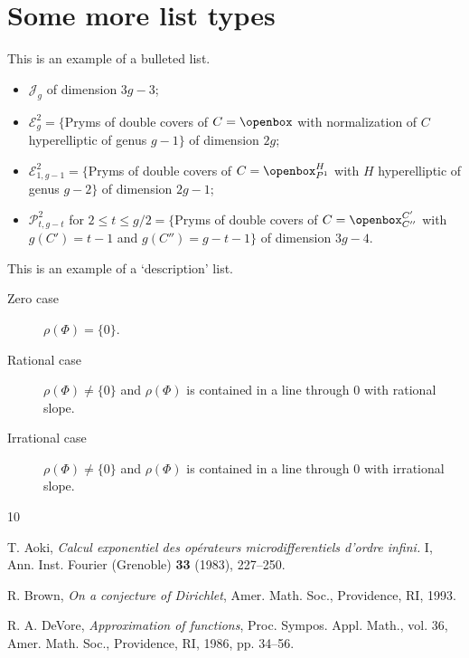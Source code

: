 \documentclass{mcom-l}
\theoremstyle{definition}
\theoremstyle{remark}
\numberwithin{equation}{section}
\newcommand{\blankbox}[2]{%
  \parbox{\columnwidth}{\centering
    \setlength{\fboxsep}{0pt}%
    \fbox{\raisebox{0pt}[#2]{\hspace{#1}}}%
  }%
}
\begin{document}
\begin{figure}[tb]
\blankbox{.75\columnwidth}{3pc}
\caption{}\label{otherfig}
\end{figure}

\section{Some more list types}
This is an example of a bulleted list.

\begin{itemize}
\item $\mathcal{J}_g$ of dimension $3g-3$;
\item $\mathcal{E}^2_g=\{$Pryms of double covers of $C=\openbox$ with
normalization of $C$ hyperelliptic of genus $g-1\}$ of dimension $2g$;
\item $\mathcal{E}^2_{1,g-1}=\{$Pryms of double covers of
$C=\openbox^H_{P^1}$ with $H$ hyperelliptic of genus $g-2\}$ of
dimension $2g-1$;
\item $\mathcal{P}^2_{t,g-t}$ for $2\le t\le g/2=\{$Pryms of double
covers of $C=\openbox^{C'}_{C''}$ with $g(C')=t-1$ and $g(C'')=g-t-1\}$
of dimension $3g-4$.
\end{itemize}

This is an example of a `description' list.

\begin{description}
\item[Zero case] $\rho(\Phi) = \{0\}$.

\item[Rational case] $\rho(\Phi) \ne \{0\}$ and $\rho(\Phi)$ is
contained in a line through $0$ with rational slope.

\item[Irrational case] $\rho(\Phi) \ne \{0\}$ and $\rho(\Phi)$ is
contained in a line through $0$ with irrational slope.
\end{description}


\begin{thebibliography}{10}

 T. Aoki, \textit{Calcul exponentiel des op\'erateurs
microdifferentiels d'ordre infini.} I, Ann. Inst. Fourier (Grenoble)
\textbf{33} (1983), 227--250.

 R. Brown, \textit{On a conjecture of Dirichlet},
Amer. Math. Soc., Providence, RI, 1993.

 R. A. DeVore, \textit{Approximation of functions},
Proc. Sympos. Appl. Math., vol. 36,
Amer. Math. Soc., Providence, RI, 1986, pp. 34--56.

\end{thebibliography}
\end{document}

